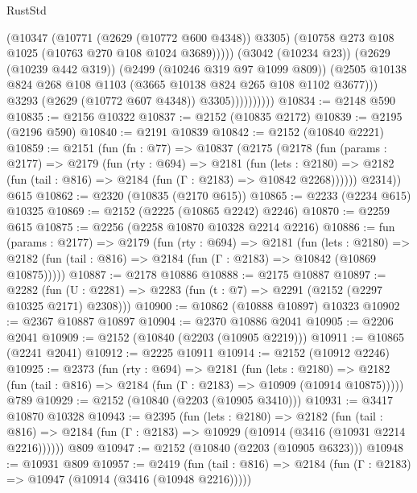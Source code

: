 \begin{lexlean}{RustStd}
\begin{coremodule}
                              (@10347
                                (@10771 (@2629 (@10772 @600 @4348)) @3305)
                                (@10758 @273 @108 @1025 (@10763 @270 @108 @1024 @3689)))))
                          (@3042 (@10234 @23))
                          (@2629 (@10239 @442 @319))
                          (@2499 (@10246 @319 @97 @1099 @809))
                          (@2505
                            @10138
                            @824
                            @268
                            @108
                            @1103
                            (@3665 @10138 @824 @265 @108 @1102 @3677)))
                        @3293
                        (@2629 (@10772 @607 @4348))
                        @3305))))))))))
@10834 := @2148 @590
@10835 := @2156 @10322
@10837 := @2152 (@10835 @2172)
@10839 := @2195 (@2196 @590)
@10840 := @2191 @10839
@10842 := @2152 (@10840 @2221)
@10859 := @2151
    (fun (fn : @77) =>
    @10837
      (@2175
        (@2178
          (fun (params : @2177) =>
          @2179
            (fun (rty : @694) =>
            @2181
              (fun (lets : @2180) =>
              @2182 (fun (tail : @816) => @2184 (fun (Γ : @2183) => @10842 @2268))))))
        @2314))
    @615
@10862 := @2320 (@10835 (@2170 @615))
@10865 := @2233 (@2234 @615) @10325
@10869 := @2152 (@2225 (@10865 @2242) @2246)
@10870 := @2259 @615
@10875 := @2256 (@2258 @10870 @10328 @2214 @2216)
@10886 := fun (params : @2177) =>
  @2179
    (fun (rty : @694) =>
    @2181
      (fun (lets : @2180) =>
      @2182 (fun (tail : @816) => @2184 (fun (Γ : @2183) => @10842 (@10869 @10875)))))
@10887 := @2178 @10886
@10888 := @2175 @10887
@10897 := @2282
    (fun (U : @2281) => @2283 (fun (t : @7) => @2291 (@2152 (@2297 @10325 @2171) @2308)))
@10900 := @10862 (@10888 @10897) @10323
@10902 := @2367 @10887 @10897
@10904 := @2370 @10886 @2041
@10905 := @2206 @2041
@10909 := @2152 (@10840 (@2203 (@10905 @2219)))
@10911 := @10865 (@2241 @2041)
@10912 := @2225 @10911
@10914 := @2152 (@10912 @2246)
@10925 := @2373
    (fun (rty : @694) =>
    @2181
      (fun (lets : @2180) =>
      @2182 (fun (tail : @816) => @2184 (fun (Γ : @2183) => @10909 (@10914 @10875)))))
    @789
@10929 := @2152 (@10840 (@2203 (@10905 @3410)))
@10931 := @3417 @10870 @10328
@10943 := @2395
    (fun (lets : @2180) =>
    @2182
      (fun (tail : @816) =>
      @2184 (fun (Γ : @2183) => @10929 (@10914 (@3416 (@10931 @2214 @2216))))))
    @809
@10947 := @2152 (@10840 (@2203 (@10905 @6323)))
@10948 := @10931 @809
@10957 := @2419
    (fun (tail : @816) => @2184 (fun (Γ : @2183) => @10947 (@10914 (@3416 (@10948 @2216)))))

\end{coremodule}
\end{lexlean}
